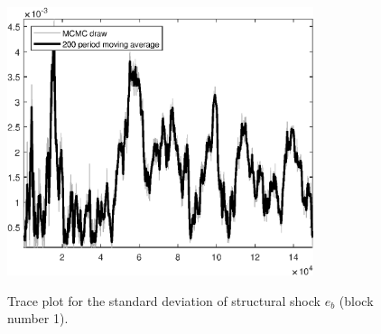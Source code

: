 \begin{figure}[H]
\centering
  \includegraphics[width=0.8\textwidth]{BRS_sectoral_wo_gmf/graphs/TracePlot_SE_e_b_blck_1}\\
    \caption{Trace plot for the standard deviation of structural shock ${e_b}$ (block number 1).}
\end{figure}
